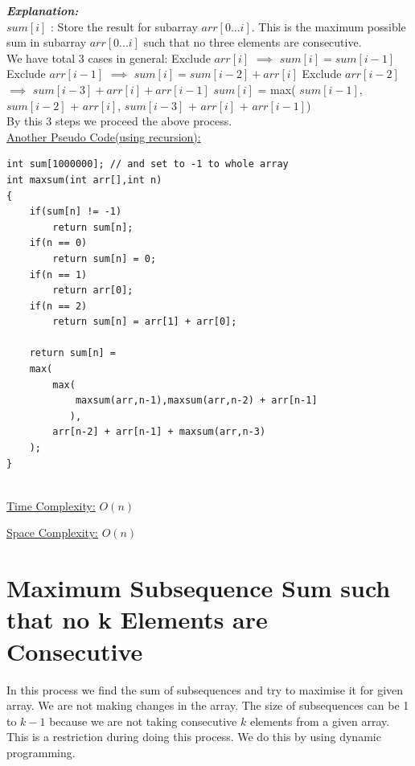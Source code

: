 \documentclass[12pt]{book}
\begin{document}
\textbf{\textit{Explanation:}}\\
	$sum[i]$ : Store the result for subarray $arr[0...i]$. This is the maximum possible sum in subarray $arr[0...i]$ such that no three elements are consecutive.\\
	
We have total 3 cases in general:
\newline
\newline
Exclude $arr[i]$ $\implies$ $sum[i] = sum[i-1]$
\newline
\newline
Exclude $arr[i-1]$ $\implies$ $sum[i] = sum[i-2] + arr[i]$
\newline
\newline
Exclude $arr[i-2]$ $\implies$ $sum[i-3] + arr[i] + arr[i-1]$
\newline
\newline
$sum[i]$ = max( $sum[i-1]$, $sum[i-2]$ + $arr[i]$, $sum[i-3]$ + $arr[i]$ + $arr[i-1]$)\\
	
By this 3 steps we proceed the above process.\\

\underline{Another Pseudo Code(using recursion):}

\begin{lstlisting}
int sum[1000000]; // and set to -1 to whole array
int maxsum(int arr[],int n)
{
    if(sum[n] != -1)
        return sum[n];
    if(n == 0)
        return sum[n] = 0;
    if(n == 1)	
        return arr[0];
    if(n == 2)
        return sum[n] = arr[1] + arr[0];

	return sum[n] = 
	max(
	    max(
	        maxsum(arr,n-1),maxsum(arr,n-2) + arr[n-1]
	       ),
	    arr[n-2] + arr[n-1] + maxsum(arr,n-3)
	);
}
\end{lstlisting}


\underline{\\Time Complexity:}  $O(n)$\newline

\underline{Space Complexity:}  $O(n)$\newline

\chapter{Maximum Subsequence Sum such that no k Elements are Consecutive}
In this process we find the sum of subsequences and try to maximise it for given array. We are not making changes in the array. The size of subsequences can be 1 to $k-1$ because we are not taking consecutive $k$ elements from a given array. This is a restriction during doing this process. We do this by using dynamic programming.\newline
\end{document}
